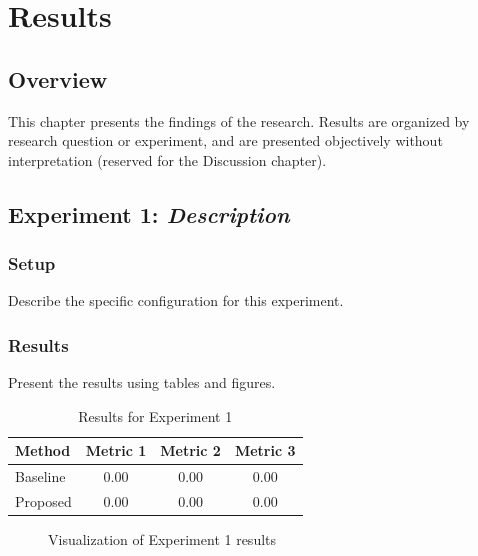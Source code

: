 \chapter{Results}
\label{ch:results}

\section{Overview}
\label{sec:results-overview}

This chapter presents the findings of the research. Results are organized
by research question or experiment, and are presented objectively without
interpretation (reserved for the Discussion chapter).

\section{Experiment 1: \emph{Description}}
\label{sec:exp1}

\subsection{Setup}
\label{sec:exp1-setup}

Describe the specific configuration for this experiment.

\subsection{Results}
\label{sec:exp1-results}

Present the results using tables and figures.

\begin{table}[htbp]
    \centering
    \caption{Results for Experiment 1}
    \label{tab:exp1}
    \begin{tabular}{lccc}
        \toprule
        \textbf{Method} & \textbf{Metric 1} & \textbf{Metric 2} & \textbf{Metric 3} \\
        \midrule
        Baseline        & 0.00 & 0.00 & 0.00 \\
        Proposed        & 0.00 & 0.00 & 0.00 \\
        \bottomrule
    \end{tabular}
\end{table}

\begin{figure}[htbp]
    \centering
    \caption{Visualization of Experiment 1 results}
    \label{fig:exp1}
\end{figure}

